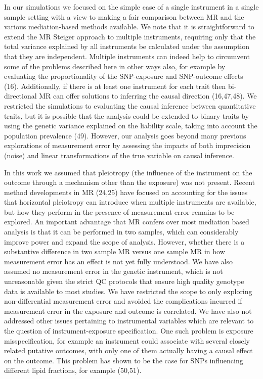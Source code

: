 \documentclass[]{article}
\begin{document}
In our simulations we focused on the simple case of a single instrument
in a single sample setting with a view to making a fair comparison
between MR and the various mediation-based methods available. We note
that it is straightforward to extend the MR Steiger approach to multiple
instruments, requiring only that the total variance explained by all
instruments be calculated under the assumption that they are
independent. Multiple instruments can indeed help to circumvent some of
the problems described here in other ways also, for example by
evaluating the proportionality of the SNP-exposure and SNP-outcome
effects (16). Additionally, if there is at least one instrument for each
trait then bi-directional MR can offer solutions to inferring the causal
direction (16,47,48). We restricted the simulations to evaluating the
causal inference between quantitative traits, but it is possible that
the analysis could be extended to binary traits by using the genetic
variance explained on the liability scale, taking into account the
population prevalence (49). However, our analysis goes beyond many
previous explorations of measurement error by assessing the impacts of
both imprecision (noise) and linear transformations of the true variable
on causal inference.

In this work we assumed that pleiotropy (the influence of the instrument
on the outcome through a mechanism other than the exposure) was not
present. Recent method developments in MR (24,25) have focused on
accounting for the issues that horizontal pleiotropy can introduce when
multiple instruments are available, but how they perform in the presence
of measurement error remains to be explored. An important advantage that
MR confers over most mediation based analysis is that it can be
performed in two samples, which can considerably improve power and
expand the scope of analysis. However, whether there is a substantive
difference in two sample MR versus one sample MR in how measurement
error has an effect is not yet fully understood. We have also assumed no
measurement error in the genetic instrument, which is not unreasonable
given the strict QC protocols that ensure high quality genotype data is
available to most studies. We have restricted the scope to only
exploring non-differential measurement error and avoided the
complications incurred if measurement error in the exposure and outcome
is correlated. We have also not addressed other issues pertaining to
instrumental variables which are relevant to the question of
instrument-exposure specification. One such problem is exposure
misspecification, for example an instrument could associate with several
closely related putative outcomes, with only one of them actually having
a causal effect on the outcome. This problem has shown to be the case
for SNPs influencing different lipid fractions, for example (50,51).
\end{document}
